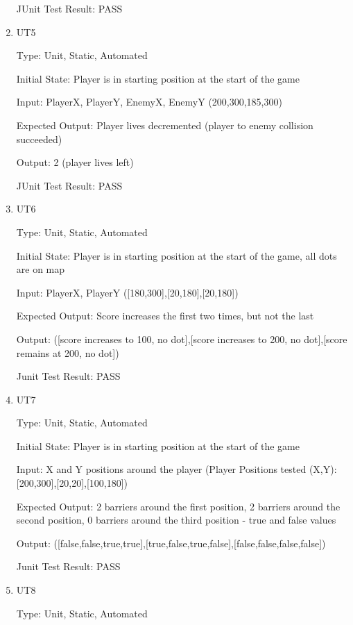 \documentclass[12pt, titlepage]{article}
\begin{document}
\begin{enumerate}
JUnit Test Result: PASS

\item{UT5\\}

Type: Unit, Static, Automated
					
Initial State: Player is in starting position at the start of the game
					
Input: PlayerX, PlayerY, EnemyX, EnemyY (200,300,185,300)
					
Expected Output: Player lives decremented (player to enemy collision succeeded)
					
Output: 2 (player lives left)

JUnit Test Result: PASS

\item{UT6\\}

Type: Unit, Static, Automated
					
Initial State: Player is in starting position at the start of the game, all dots are on map
					
Input: PlayerX, PlayerY ([180,300],[20,180],[20,180])
					
Expected Output: Score increases the first two times, but not the last
					
Output: ([score increases to 100, no dot],[score increases to 200, no dot],[score remains at 200, no dot])

Junit Test Result: PASS

\item{UT7\\}

Type: Unit, Static, Automated
					
Initial State: Player is in starting position at the start of the game
					
Input: X and Y positions around the player (Player Positions tested (X,Y): [200,300],[20,20],[100,180])
					
Expected Output: 2 barriers around the first position, 2 barriers around the second position, 0 barriers around the third position - true and false values
					
Output: ([false,false,true,true],[true,false,true,false],[false,false,false,false])

Junit Test Result: PASS

\item{UT8\\}

Type: Unit, Static, Automated
					

\end{enumerate}
\end{document}

